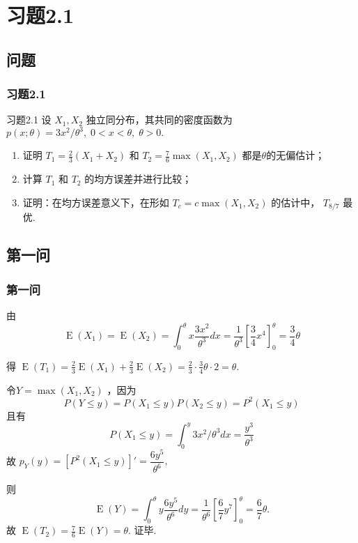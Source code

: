 \section{习题2.1}
\subsection{问题}
\begin{frame}
    \frametitle{习题2.1}
    \begin{example}{习题2.1}
       设 $X_1,X_2$ 独立同分布，其共同的密度函数为 $p(x;\theta)=3x^2/\theta^3,\;0<x<\theta,\; \theta>0.$
       \begin{enumerate}
        \item 证明 $T_1=\frac{2}{3}(X_1+X_2)$ 和 $T_2=\frac{7}{6} \max(X_1,X_2)$ 都是$ \theta $的无偏估计；
    
        \item 计算 $T_1$ 和 $T_2$ 的均方误差并进行比较；
    
        \item 证明：在均方误差意义下，在形如 $T_c=c \max(X_1,X_2)$ 的估计中， $T_{8/7}$ 最优.
       \end{enumerate}
    \end{example}
\end{frame}
\subsection{第一问}
\begin{frame}[c,allowframebreaks]
    \frametitle{第一问}
    由
    \[
        \operatorname{E}(X_1)=\operatorname{E}(X_2)=\int_{0}^{\theta}x\frac{3x^2}{\theta^3}dx=\frac{1}{\theta^3}\left[ \frac{3}{4}x^4\right]^{\theta}_{0}=\frac{3}{4}\theta
    \]

    得 $\operatorname{E}(T_1)=\frac{2}{3}\operatorname{E}(X_1)+\frac{2}{3}\operatorname{E}(X_2)=\frac{2}{3} \cdot \frac{3}{4}\theta \cdot 2= \theta.$

    令$ Y=\max(X_1,X_2)$ ，因为 
    \[
        P(Y \leqslant y)=P(X_1 \leqslant y)P(X_2 \leqslant y)=P^2(X_1 \leqslant y)
    \]
    且有 
    \[
        P(X_1 \leqslant y)=\int_{0}^{y}3x^2/\theta^3dx=\frac{y^3}{\theta^3}
    \]
    故 $p_Y(y)=[P^2(X_1 \leqslant y)]'=\dfrac{6y^5}{\theta^6},$

    则 
    \[
        \operatorname{E}(Y)=\int_{0}^{\theta} y \frac{6y^5}{\theta^6} dy= \frac{1}{\theta^6}\left[ \frac{6}{7}y^7 \right]_0^{\theta}= \frac{6}{7}\theta. 
    \]
    故 $\operatorname{E}(T_2)=\frac{7}{6}\operatorname{E}(Y)=\theta . $
    证毕.
\end{frame}
